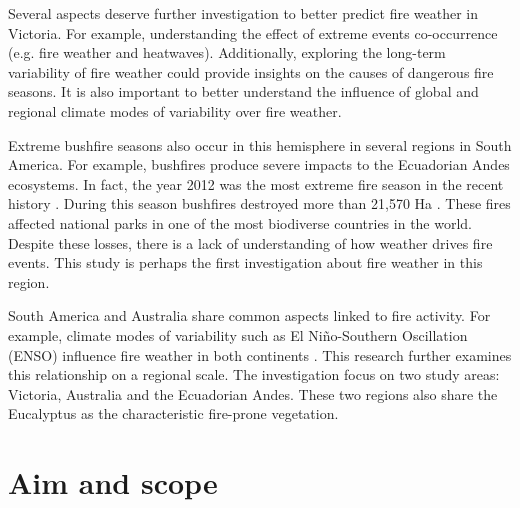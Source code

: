 Several aspects deserve further investigation to better predict fire
weather in Victoria. For example, understanding the effect of extreme
events co-occurrence (e.g. fire weather and heatwaves). Additionally,
exploring the long-term variability of fire weather could provide
insights on the causes of dangerous fire seasons. It is also important
to better understand the influence of global and regional climate
modes of variability over fire weather.

Extreme bushfire seasons also occur in this hemisphere in several
regions in South America. For example, bushfires produce severe impacts
to the Ecuadorian Andes ecosystems. In fact, the year 2012 was the
most extreme fire season in the recent history \citep{MinisteriodelAmbiente2013,SecretariadeAmbiente2013}.
During this season bushfires destroyed more than 21,570 Ha \citep{MinisteriodelAmbiente2013}.
These fires affected national parks in one of the most biodiverse
countries in the world. Despite these losses, there is a lack of understanding
of how weather drives fire events. This study is perhaps the first
investigation about fire weather in this region. 

South America and Australia share common aspects linked to fire activity.
For example, climate modes of variability such as El Ni\~no-Southern
Oscillation (ENSO) influence fire weather in both continents \citep{Williams1999,Chen2011}.
This research further examines this relationship on a regional scale.
The investigation focus on two study areas: Victoria, Australia and
the Ecuadorian Andes. These two regions also share the Eucalyptus
as the characteristic fire-prone vegetation.


\section{Aim and scope}

